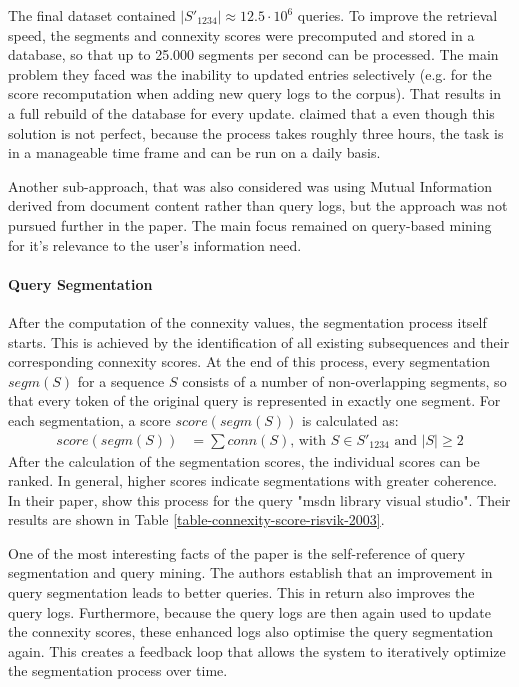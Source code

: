The final dataset contained $|S'_{1234}| \approx 12.5 \cdot 10^6$ queries. 
To improve the retrieval speed, the segments and connexity scores were precomputed and stored in a database, so that up to 25.000 segments per second can be processed. The main problem they faced was the inability to updated entries selectively (e.g. for the score recomputation when adding new query logs to the corpus). That results in a full rebuild of the database for every update. \citeauthor{Risvik:2003} claimed that a even though this solution is not perfect, because the process takes roughly three hours, the task is in a manageable time frame and can be run on a daily basis.

Another sub-approach, that was also considered was using Mutual Information derived from document content rather than query logs, but the approach was not pursued further in the paper. The main focus remained on query-based mining for it's relevance to the user's information need.

\paragraph*{Query Segmentation}
After the computation of the connexity values, the segmentation process itself starts. This is achieved by the identification of all existing subsequences and their corresponding connexity scores. At the end of this process, every segmentation $segm(S)$ for a sequence $S$ consists of a number of non-overlapping segments, so that every token of the original query is represented in exactly one segment. For each segmentation, a score $score(segm(S))$ is calculated as:
\begin{align*}
score(segm(S)) &= \sum conn(S) \text{, with } S \in S'_{1234} \text{ and } |S| \ge 2
\end{align*}
After the calculation of the segmentation scores, the individual scores can be ranked. In general, higher scores indicate segmentations with greater coherence. In their paper, \citeauthor{Risvik:2003} show this process for the query "msdn library visual studio". Their results are shown in Table \ref{table-connexity-score-risvik-2003}.




One of the most interesting facts of the paper is the self-reference of 
query segmentation and query mining. The authors establish that an improvement in query segmentation leads to better queries. This in return also improves the query logs. Furthermore, because the query logs are then again used to update the connexity scores, these enhanced logs also optimise the query segmentation again. This creates a feedback loop that allows the system to iteratively optimize the segmentation process over time.

